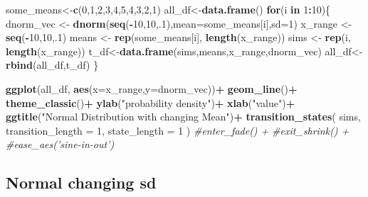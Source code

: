 \documentclass[]{book}
\newenvironment{Shaded}{\begin{snugshade}}{\end{snugshade}}
\newcommand{\CommentTok}[1]{\textcolor[rgb]{0.56,0.35,0.01}{\textit{#1}}}
\newcommand{\ControlFlowTok}[1]{\textcolor[rgb]{0.13,0.29,0.53}{\textbf{#1}}}
\newcommand{\DataTypeTok}[1]{\textcolor[rgb]{0.13,0.29,0.53}{#1}}
\newcommand{\DecValTok}[1]{\textcolor[rgb]{0.00,0.00,0.81}{#1}}
\newcommand{\KeywordTok}[1]{\textcolor[rgb]{0.13,0.29,0.53}{\textbf{#1}}}
\newcommand{\NormalTok}[1]{#1}
\newcommand{\OperatorTok}[1]{\textcolor[rgb]{0.81,0.36,0.00}{\textbf{#1}}}
\newcommand{\StringTok}[1]{\textcolor[rgb]{0.31,0.60,0.02}{#1}}
\begin{document}
\begin{Shaded}
\begin{Highlighting}[]
\NormalTok{some_means<-}\KeywordTok{c}\NormalTok{(}\DecValTok{0}\NormalTok{,}\DecValTok{1}\NormalTok{,}\DecValTok{2}\NormalTok{,}\DecValTok{3}\NormalTok{,}\DecValTok{4}\NormalTok{,}\DecValTok{5}\NormalTok{,}\DecValTok{4}\NormalTok{,}\DecValTok{3}\NormalTok{,}\DecValTok{2}\NormalTok{,}\DecValTok{1}\NormalTok{)}
\NormalTok{all_df<-}\KeywordTok{data.frame}\NormalTok{()}
\ControlFlowTok{for}\NormalTok{(i }\ControlFlowTok{in} \DecValTok{1}\OperatorTok{:}\DecValTok{10}\NormalTok{)\{}
\NormalTok{  dnorm_vec <-}\StringTok{ }\KeywordTok{dnorm}\NormalTok{(}\KeywordTok{seq}\NormalTok{(}\OperatorTok{-}\DecValTok{10}\NormalTok{,}\DecValTok{10}\NormalTok{,.}\DecValTok{1}\NormalTok{),}\DataTypeTok{mean=}\NormalTok{some_means[i],}\DataTypeTok{sd=}\DecValTok{1}\NormalTok{)}
\NormalTok{  x_range   <-}\StringTok{ }\KeywordTok{seq}\NormalTok{(}\OperatorTok{-}\DecValTok{10}\NormalTok{,}\DecValTok{10}\NormalTok{,.}\DecValTok{1}\NormalTok{)}
\NormalTok{  means <-}\StringTok{ }\KeywordTok{rep}\NormalTok{(some_means[i], }\KeywordTok{length}\NormalTok{(x_range))}
\NormalTok{  sims <-}\StringTok{ }\KeywordTok{rep}\NormalTok{(i, }\KeywordTok{length}\NormalTok{(x_range))}
\NormalTok{  t_df<-}\KeywordTok{data.frame}\NormalTok{(sims,means,x_range,dnorm_vec)}
\NormalTok{  all_df<-}\KeywordTok{rbind}\NormalTok{(all_df,t_df)}
\NormalTok{\}}

\KeywordTok{ggplot}\NormalTok{(all_df, }\KeywordTok{aes}\NormalTok{(}\DataTypeTok{x=}\NormalTok{x_range,}\DataTypeTok{y=}\NormalTok{dnorm_vec))}\OperatorTok{+}
\StringTok{  }\KeywordTok{geom_line}\NormalTok{()}\OperatorTok{+}
\StringTok{  }\KeywordTok{theme_classic}\NormalTok{()}\OperatorTok{+}
\StringTok{  }\KeywordTok{ylab}\NormalTok{(}\StringTok{"probability density"}\NormalTok{)}\OperatorTok{+}
\StringTok{  }\KeywordTok{xlab}\NormalTok{(}\StringTok{"value"}\NormalTok{)}\OperatorTok{+}
\StringTok{  }\KeywordTok{ggtitle}\NormalTok{(}\StringTok{"Normal Distribution with changing Mean"}\NormalTok{)}\OperatorTok{+}
\StringTok{   }\KeywordTok{transition_states}\NormalTok{(}
\NormalTok{    sims,}
    \DataTypeTok{transition_length =} \DecValTok{1}\NormalTok{,}
    \DataTypeTok{state_length =} \DecValTok{1}
\NormalTok{  )}
  \CommentTok{#enter_fade() + }
  \CommentTok{#exit_shrink() +}
  \CommentTok{#ease_aes('sine-in-out')}
\end{Highlighting}
\end{Shaded}

\hypertarget{normal-changing-sd}{%
\subsection{Normal changing sd}\label{normal-changing-sd}}
\end{document}
